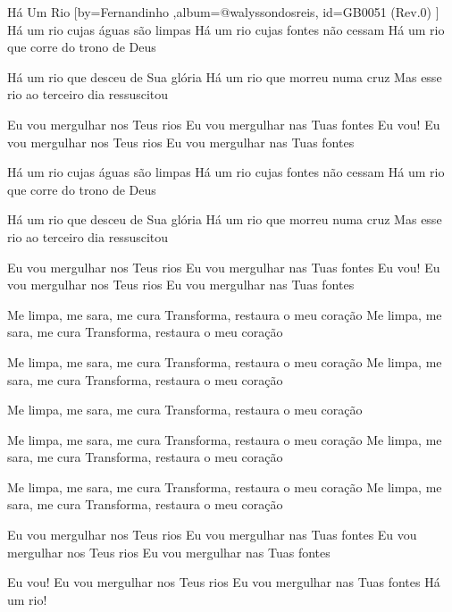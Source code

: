 \beginsong
{Há Um Rio %
}[by={Fernandinho %
},album={@walyssondosreis},
id={GB0051 %
(Rev.0) %
}]
Há um rio cujas águas são limpas
Há um rio cujas fontes não cessam
Há um rio que corre do trono de Deus

Há um rio que desceu de Sua glória
Há um rio que morreu numa cruz
Mas esse rio ao terceiro dia ressuscitou

Eu vou mergulhar nos Teus rios
Eu vou mergulhar nas Tuas fontes
Eu vou!
Eu vou mergulhar nos Teus rios
Eu vou mergulhar nas Tuas fontes

Há um rio cujas águas são limpas
Há um rio cujas fontes não cessam
Há um rio que corre do trono de Deus

Há um rio que desceu de Sua glória
Há um rio que morreu numa cruz
Mas esse rio ao terceiro dia ressuscitou

Eu vou mergulhar nos Teus rios
Eu vou mergulhar nas Tuas fontes
Eu vou!
Eu vou mergulhar nos Teus rios
Eu vou mergulhar nas Tuas fontes

Me limpa, me sara, me cura
Transforma, restaura o meu coração
Me limpa, me sara, me cura
Transforma, restaura o meu coração

Me limpa, me sara, me cura
Transforma, restaura o meu coração
Me limpa, me sara, me cura
Transforma, restaura o meu coração

Me limpa, me sara, me cura
Transforma, restaura o meu coração

Me limpa, me sara, me cura
Transforma, restaura o meu coração
Me limpa, me sara, me cura
Transforma, restaura o meu coração

Me limpa, me sara, me cura
Transforma, restaura o meu coração
Me limpa, me sara, me cura
Transforma, restaura o meu coração

Eu vou mergulhar nos Teus rios
Eu vou mergulhar nas Tuas fontes
Eu vou mergulhar nos Teus rios
Eu vou mergulhar nas Tuas fontes

Eu vou!
Eu vou mergulhar nos Teus rios
Eu vou mergulhar nas Tuas fontes
Há um rio!


